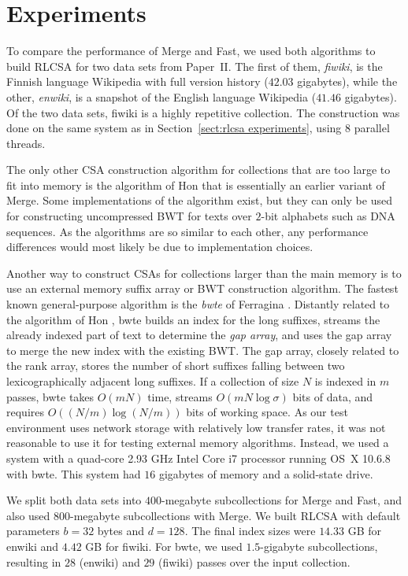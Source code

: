 \section{Experiments}

To compare the performance of Merge and Fast, we used both algorithms to build RLCSA for two data sets from Paper~II. The first of them, \emph{fiwiki}, is the Finnish language Wikipedia with full version history ($42.03$ gigabytes), while the other, \emph{enwiki}, is a snapshot of the English language Wikipedia ($41.46$ gigabytes). Of the two data sets, fiwiki is a highly repetitive collection. The construction was done on the same system as in Section~\ref{sect:rlcsa experiments}, using 8 parallel threads.

The only other CSA construction algorithm for collections that are too large to fit into memory is the algorithm of Hon  that is essentially an earlier variant of Merge. Some implementations \cite{Lam2008,Li2009} of the algorithm exist, but they can only be used for constructing uncompressed BWT for texts over $2$\nobreakdash-bit alphabets such as DNA sequences. As the algorithms are so similar to each other, any performance differences would most likely be due to implementation choices.

Another way to construct CSAs for collections larger than the main memory is to use an external memory suffix array or BWT construction algorithm. The fastest known general-purpose algorithm is the \emph{bwte} of Ferragina . Distantly related to the algorithm of Hon , bwte builds an index for the long suffixes, streams the already indexed part of text to determine the \emph{gap array}, and uses the gap array to merge the new index with the existing BWT. The gap array, closely related to the rank array, stores the number of short suffixes falling between two lexicographically adjacent long suffixes. If a collection of size $N$ is indexed in $m$ passes, bwte takes $O(mN)$ time, streams $O(mN \log \sigma)$ bits of data, and requires $O((N/m) \log (N/m))$ bits of working space. As our test environment uses network storage with relatively low transfer rates, it was not reasonable to use it for testing external memory algorithms. Instead, we used a system with a quad-core 2.93 GHz Intel Core i7 processor running OS~X 10.6.8 with bwte. This system had $16$ gigabytes of memory and a solid-state drive.

We split both data sets into $400$\nobreakdash-megabyte subcollections for Merge and Fast, and also used $800$\nobreakdash-megabyte subcollections with Merge. We built RLCSA with default parameters $b = 32$ bytes and $d = 128$. The final index sizes were $14.33$ GB for enwiki and $4.42$ GB for fiwiki. For bwte, we used $1.5$\nobreakdash-gigabyte subcollections, resulting in $28$ (enwiki) and $29$ (fiwiki) passes over the input collection.

